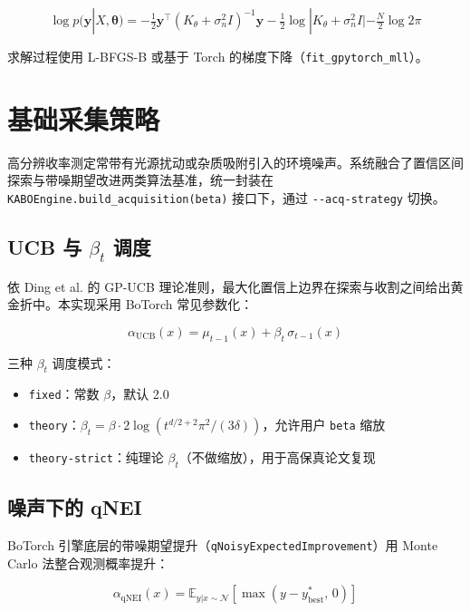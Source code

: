\documentclass[12pt,a4paper]{article}
\newcommand{\brk}{\discretionary{}{}{}}
\begin{document}
\begin{equation}
    \log p(\mathbf{y} | X, \bm{\theta}) = -\tfrac{1}{2} \mathbf{y}^\top (K_\theta + \sigma_n^2 I)^{-1} \mathbf{y} - \tfrac{1}{2} \log|K_\theta + \sigma_n^2 I| - \tfrac{N}{2} \log 2\pi
\end{equation}

求解过程使用 L-BFGS-B 或基于 Torch 的梯度下降（\texttt{fit\_gpytorch\_mll}）。


\section{基础采集策略}

高分辨收率测定常带有光源扰动或杂质吸附引入的环境噪声。系统融合了置信区间探索与带噪期望改进两类算法基准，统一封装在 \texttt{KABOEngine.\brk build\_acquisition(beta)} 接口下，通过 \texttt{-{}-acq-strategy} 切换。

\subsection{UCB 与 $\beta_t$ 调度}

依 Ding et al.\cite{gpucb2026} 的 GP-UCB 理论准则，最大化置信上边界在探索与收割之间给出黄金折中。本实现采用 BoTorch 常见参数化：

\begin{equation}
    \alpha_{\text{UCB}}(x) = \mu_{t-1}(x) + \beta_t \, \sigma_{t-1}(x)
\end{equation}

三种 $\beta_t$ 调度模式：

\begin{itemize}
    \item \texttt{fixed}：常数 $\beta$，默认 2.0
    \item \texttt{theory}：$\beta_t = \beta \cdot 2 \log \left( t^{d/2 + 2} \pi^2 / (3 \delta) \right)$，允许用户 \texttt{beta} 缩放
    \item \texttt{theory-strict}：纯理论 $\beta_t$（不做缩放），用于高保真论文复现
\end{itemize}

\subsection{噪声下的 qNEI}

BoTorch 引擎底层的带噪期望提升（\texttt{qNoisyExpectedImprovement}）用 Monte Carlo 法整合观测概率提升\cite{cbo2017}：

\begin{equation}
    \alpha_{\text{qNEI}}(x) = \mathbb{E}_{y|x \sim \mathcal{N}}\left[ \max(y - y_{\text{best}}^*,\, 0) \right]
\end{equation}
\end{document}
